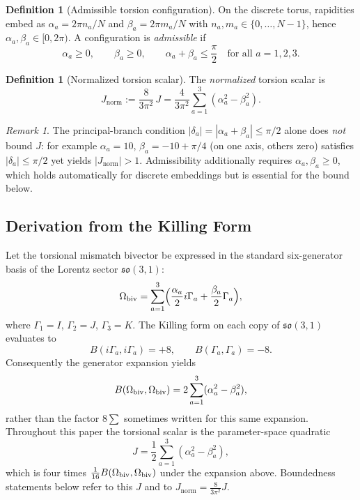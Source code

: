 \documentclass[a4paper]{article}
\theoremstyle{definition}
\newtheorem{definition}[theorem]{Definition}
\theoremstyle{remark}
\newtheorem{remark}[theorem]{Remark}
\newcommand{\Jnorm}{J_{\mathrm{norm}}}
\begin{document}
\begin{definition}[Admissible torsion configuration]
\label{def:admissible}
On the discrete torus, rapidities embed as \(\alpha_a = 2\pi n_a/N\) and \(\beta_a = 2\pi m_a/N\) with \(n_a,m_a \in \{0,\dots,N-1\}\), hence \(\alpha_a,\beta_a \in [0,2\pi)\). A configuration is \emph{admissible} if
\[
\alpha_a \geq 0, \qquad \beta_a \geq 0, \qquad \alpha_a + \beta_a \leq \frac{\pi}{2}
\quad \text{for all } a = 1,2,3.
\]
\end{definition}

\begin{definition}[Normalized torsion scalar]
\label{def:Jnorm}
The \emph{normalized} torsion scalar is
\[
\Jnorm := \frac{8}{3\pi^2}\,J
= \frac{4}{3\pi^2}\sum_{a=1}^3 (\alpha_a^2 - \beta_a^2).
\]
\end{definition}

\begin{remark}
The principal-branch condition \(|\delta_a| = |\alpha_a + \beta_a| \leq \pi/2\) alone does \emph{not} bound \(J\): for example \(\alpha_a = 10\), \(\beta_a = -10 + \pi/4\) (on one axis, others zero) satisfies \(|\delta_a| \leq \pi/2\) yet yields \(|\Jnorm| > 1\). Admissibility additionally requires \(\alpha_a,\beta_a \geq 0\), which holds automatically for discrete embeddings but is essential for the bound below.
\end{remark}

\subsection{Derivation from the Killing Form}

Let the torsional mismatch bivector be expressed in the standard six-generator basis of the Lorentz sector \( \mathfrak{so}(3,1) \):
\[
\Omega_{\rm biv} = \sum_{a=1}^3 \Bigl( \frac{\alpha_a}{2} i\Gamma_a + \frac{\beta_a}{2} \Gamma_a \Bigr),
\]
where \( \Gamma_1 = I \), \( \Gamma_2 = J \), \( \Gamma_3 = K \). The Killing form on each copy of \( \mathfrak{so}(3,1) \) evaluates to
\[
B(i\Gamma_a, i\Gamma_a) = +8, \qquad B(\Gamma_a, \Gamma_a) = -8.
\]
Consequently the generator expansion yields
\[
B(\Omega_{\rm biv}, \Omega_{\rm biv}) = 2 \sum_{a=1}^3 (\alpha_a^2 - \beta_a^2),
\]
rather than the factor \(8\sum\) sometimes written for this same expansion. Throughout this paper the torsional scalar is the parameter-space quadratic
\[
J = \frac12 \sum_{a=1}^3 (\alpha_a^2 - \beta_a^2),
\]
which is four times \(\frac1{16}B(\Omega_{\rm biv},\Omega_{\rm biv})\) under the expansion above. Boundedness statements below refer to this \(J\) and to \(\Jnorm=\frac8{3\pi^2}J\).
\end{document}
